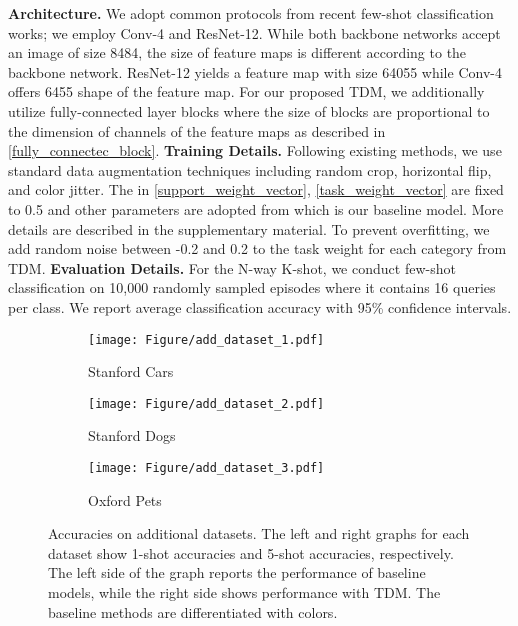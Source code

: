 \endgroup
\noindent\textbf{Architecture.} 
We adopt common protocols from recent few-shot classification works\cite{kim2019edge, chen2021pareto, zhao2021looking, hong2021reinforced, zhang2021rethinking}; we employ Conv-4 and ResNet-12.
While both backbone networks accept an image of size 8484, the size of feature maps is different according to the backbone network.
ResNet-12 yields a feature map with size 64055 while Conv-4 offers 6455 shape of the feature map.
For our proposed TDM, we additionally utilize fully-connected layer blocks where the size of blocks are proportional to the dimension of channels of the feature maps as described in \cref{fully_connectec_block}. 
\newline
\textbf{Training Details.} 
Following existing methods\cite{chen2019closer, wang2019simpleshot, ye2020few, zhang2020deepemd, wertheimer2021few}, we use standard data augmentation techniques including random crop, horizontal flip, and color jitter. 
The  in \cref{support_weight_vector}, \cref{task_weight_vector} are fixed to 0.5 and other parameters are adopted from \cite{wertheimer2021few} which is our baseline model. 
More details are described in the supplementary material.
To prevent overfitting, we add random noise between -0.2 and 0.2 to the task weight for each category from TDM.
\newline
\textbf{Evaluation Details.} 
For the N-way K-shot, we conduct few-shot classification on 10,000 randomly sampled episodes where it contains 16 queries per class. 
We report average classification accuracy with 95\% confidence intervals.
\begin{figure*}
    \centering
    \begin{subfigure}[b]{0.33\textwidth}
        \centering
        \texttt{[image: Figure/add\_dataset\_1.pdf]}
        \caption{Stanford Cars}
        \vspace{-0.3cm}
        \label{fig:y equals x}
    \end{subfigure}
    \hfill
    \begin{subfigure}[b]{0.33\textwidth}
        \centering
        \texttt{[image: Figure/add\_dataset\_2.pdf]}
        \caption{Stanford Dogs}
        \vspace{-0.3cm}
        \label{fig:three sin x}
    \end{subfigure}
    \hfill
        \begin{subfigure}[b]{0.33\textwidth}
        \centering
        \texttt{[image: Figure/add\_dataset\_3.pdf]}
        \caption{Oxford Pets}
        \vspace{-0.3cm}
        \label{fig:three sin x}
    \end{subfigure}
    \caption{
    Accuracies on additional datasets. 
    The left and right graphs for each dataset show 1-shot accuracies and 5-shot accuracies, respectively.
    The left side of the graph reports the performance of baseline models, while the right side shows performance with TDM. The baseline methods are differentiated with colors.
    }
    \label{fig:additional_dataset}
    \vspace{-0.4cm}
\end{figure*}
%
 
